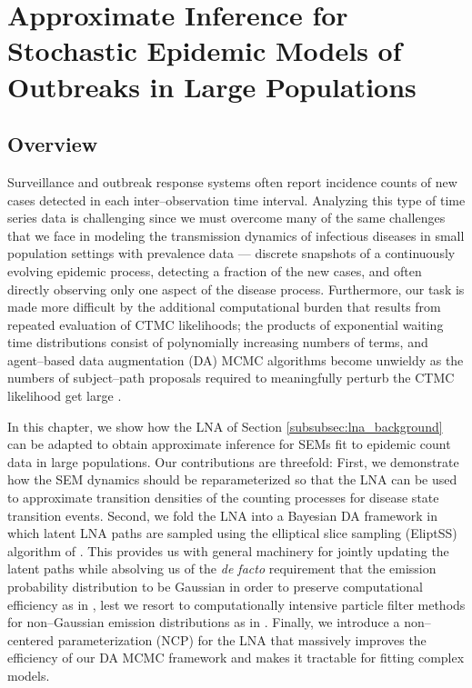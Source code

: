 \chapter{Approximate Inference for Stochastic Epidemic Models of Outbreaks in Large Populations}
\label{chap:lna_for_sems}

\section{Overview}
\label{sec:lna_overview}

Surveillance and outbreak response systems often report incidence counts of new cases detected in each inter--observation time interval. Analyzing this type of time series data is challenging since we must overcome many of the same challenges that we face in modeling the transmission dynamics of infectious diseases in small population settings with prevalence data --- discrete snapshots of a continuously evolving epidemic process, detecting a fraction of the new cases, and often directly observing only one aspect of the disease process. Furthermore, our task is made more difficult by the additional computational burden that results from repeated evaluation of CTMC likelihoods; the products of exponential waiting time distributions consist of polynomially increasing numbers of terms, and agent--based data augmentation (DA) MCMC algorithms become unwieldy as the numbers of subject--path proposals required to meaningfully perturb the CTMC likelihood get large \citep{fintzi2017efficient}. 

In this chapter, we show how the LNA of Section \ref{subsubsec:lna_background} can be adapted to obtain approximate inference for SEMs fit to epidemic count data in large populations. Our contributions are threefold: First, we demonstrate how the SEM dynamics should be reparameterized so that the LNA can be used to approximate transition densities of the counting processes for disease state transition events. Second, we fold the LNA into a Bayesian DA framework in which latent LNA paths are sampled using the elliptical slice sampling (EliptSS) algorithm of \cite{murray2010}. This provides us with general machinery for jointly updating the latent paths while absolving us of the \textit{de facto} requirement that the emission probability distribution to be Gaussian in order to preserve computational efficiency as in \cite{fearnhead2014,komorowski2009}, lest we resort to computationally intensive particle filter methods for non--Gaussian emission distributions as in \cite{golightly2015delayed}. Finally, we introduce a non--centered parameterization (NCP) for the LNA that massively improves the efficiency of our DA MCMC framework and makes it tractable for fitting complex models. 

